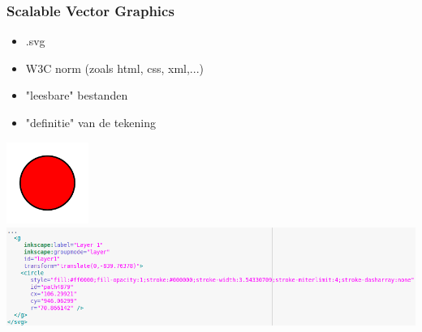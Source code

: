 \documentclass[t]{beamer}
\begin{document}
	\begin{frame}
		\frametitle{Scalable Vector Graphics}
		\begin{itemize}
			\item .svg
			\item W3C norm (zoals html, css, xml,...)
			\item "leesbare" bestanden
			\item "definitie" van de tekening
		\end{itemize}
		\vspace{0.5cm}
		\begin{center}
			\hfill \includegraphics[width=0.2\textwidth]{fig/simpele_tekening}\\
			\vspace{-0.2cm}
			\includegraphics[width=\textwidth]{fig/simpele_tekening_bron.png}
		\end{center}	
	\end{frame}
\end{document}
